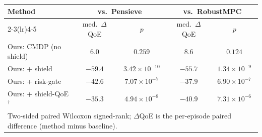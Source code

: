 \begin{tabular}{@{}lcccc@{}}
\toprule
Method & \multicolumn{2}{c}{vs.\ Pensieve} & \multicolumn{2}{c}{vs.\ RobustMPC} \\
\cmidrule(lr){2-3}\cmidrule(lr){4-5}
 & med.\ $\Delta$QoE & $p$ & med.\ $\Delta$QoE & $p$ \\
\midrule
Ours: CMDP (no shield) & $6.0$ & $0.259$ & $8.6$ & $0.124$ \\
Ours: + shield & $-59.4$ & $3.42\times10^{-10}$ & $-55.7$ & $1.34\times10^{-9}$ \\
Ours: + risk-gate & $-42.6$ & $7.07\times10^{-7}$ & $-37.9$ & $6.90\times10^{-7}$ \\
Ours: + shield-QoE$^{\dagger}$ & $-35.3$ & $4.94\times10^{-8}$ & $-40.9$ & $7.31\times10^{-6}$ \\
\bottomrule
\multicolumn{5}{l}{\footnotesize Two-sided paired Wilcoxon signed-rank; $\Delta$QoE is the per-episode paired difference (method minus baseline).} \\
\end{tabular}